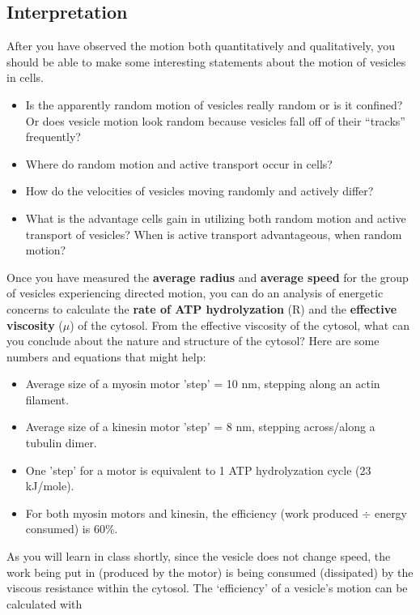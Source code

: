 \subsection*{Interpretation}
After you have observed the motion both quantitatively and qualitatively, you should be able to make some interesting statements about the motion of vesicles in cells.
\begin{itemize}
\item Is the apparently random motion of vesicles really random or is it confined? Or does vesicle motion look random because vesicles fall off of their ``tracks'' frequently?
\item Where do random motion and active transport occur in cells?
\item How do the velocities of vesicles moving randomly and actively differ?
\item What is the advantage cells gain in utilizing both random motion and active transport of vesicles? When is active transport advantageous, when random motion?
\end{itemize}
Once you have measured the \textbf{average radius} and \textbf{average speed} for the group of vesicles experiencing directed motion, you can do an analysis of energetic concerns to calculate the \textbf{rate of ATP hydrolyzation} (R) and the \textbf{effective viscosity} ($\mu$) of the cytosol. From the effective viscosity of the cytosol, what can you conclude about the nature and structure of the cytosol? Here are some numbers and equations that might help:
\begin{itemize}
\item Average size of a myosin motor 'step' = 10 nm, stepping along an actin filament.
\item Average size of a kinesin motor 'step' = 8 nm, stepping across/along a tubulin dimer.
\item One 'step' for a motor is equivalent to 1 ATP hydrolyzation cycle (23 kJ/mole).
\item For both myosin motors and kinesin, the efficiency (work produced $\div$ energy consumed) is 60\%.
\end{itemize}
As you will learn in class shortly, since the vesicle does not change speed, the work being put in (produced by the motor) is being consumed (dissipated) by the viscous resistance within the cytosol.
The `efficiency' of a vesicle's motion can be calculated with
